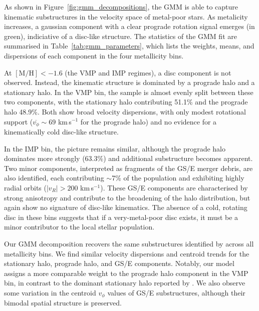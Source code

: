 \documentclass[a4paper,12pt]{article}
\begin{document}
As shown in Figure~\ref{fig:gmm_decompositions}, the GMM is able to capture kinematic substructures in the velocity space 
of metal-poor stars. As metalicity increases, a gaussian component with a clear prograde rotation signal emerges (in green),
indiciative of a disc-like structure. The statistics of the GMM fit are summarised in Table~\ref{tab:gmm_parameters},
which lists the weights, means, and dispersions of each component in the four metallicity bins. 


At $\mathrm{[M/H]} < -1.6$ (the VMP and IMP regimes), a disc component is not observed. Instead, the kinematic structure 
is dominated by a prograde halo and a stationary halo. In the VMP bin, the sample is almost evenly split between these 
two components, with the stationary halo contributing 51.1\% and the prograde halo 48.9\%. Both show broad velocity 
dispersions, with only modest rotational support ($\overline{v_\phi} \sim 69$ km\,s$^{-1}$ for the prograde halo) 
and no evidence for a kinematically cold disc-like structure.

In the IMP bin, the picture remains similar, although the prograde halo dominates more strongly 
(63.3\%) and additional substructure becomes apparent. Two minor components, interpreted as fragments of the 
GS/E merger debris, are also identified, each contributing $\sim$7\% of the population 
and exhibiting highly radial orbits ($|v_R| > 200$ km\,s$^{-1}$). These GS/E components are characterised by 
strong anisotropy and contribute to the broadening of the halo distribution, but again show no signature of 
disc-like kinematics. The absence of a cold, rotating disc in these bins suggests that if a very-metal-poor 
disc exists, it must be a minor contributor to the local stellar population.

Our GMM decomposition recovers the same substructures identified by \citet{zhang2024existencemetalpoordiscmilky} 
across all metallicity bins. We find similar velocity dispersions and centroid trends for the stationary halo, 
prograde halo, and GS/E components. Notably, our model assigns a more comparable weight to the 
prograde halo component in the VMP bin, in contrast to the dominant stationary 
halo reported by \citet{zhang2024existencemetalpoordiscmilky}. We also observe some variation 
in the centroid $v_\phi$ values of GS/E substructures, although their bimodal spatial structure is preserved. 
\end{document}
